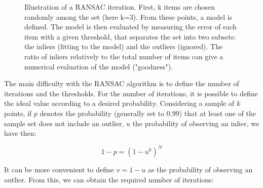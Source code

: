 \begin{figure}[h!]
\centering%
\caption{Illustration of a RANSAC iteration. First, k items are chosen randomly among the set (here k=3). From these points, a model is defined. The model is then evaluated by measuring the error of each item with a given threshold, that separates the set into two subsets: the inliers (fitting to the model) and the outliers (ignored). The ratio of inliers relatively to the total number of items can give a numerical evaluation of the model ("goodness").}
\end{figure}


The main difficulty with the RANSAC algorithm is to define the number of iterations and the thresholds.
For the number of iterations, it is possible to define the ideal value according to a desired probability. Considering a sample of $k$ points, if $p$ denotes the probability (generally set to 0.99) that at least one of the sample set does not include an outlier, $u$ the probability of observing an inlier, we have then:

\[
1-p = (1-u^k)^N
\]

It can be more convenient to define $v=1-u$ as the probability of observing an outlier. From this, we can obtain the required number of iterations:

